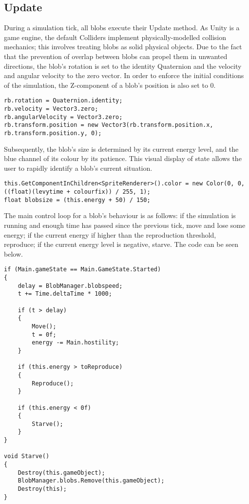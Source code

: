 \subsection{Update}
During a simulation tick, all blobs execute their Update method. As Unity is a game engine, the default Colliders implement physically-modelled collision mechanics; this involves treating blobs as solid physical objects. Due to the fact that the prevention of overlap between blobs can propel them in unwanted directions, the blob's rotation is set to the identity Quaternion and the velocity and angular velocity to the zero vector. In order to enforce the initial conditions of the simulation, the Z-component of a blob's position is also set to 0.

\begin{lstlisting}
rb.rotation = Quaternion.identity;
rb.velocity = Vector3.zero;
rb.angularVelocity = Vector3.zero;
rb.transform.position = new Vector3(rb.transform.position.x, rb.transform.position.y, 0);
\end{lstlisting}

Subsequently, the blob's size is determined by its current energy level, and the blue channel of its colour by its patience. This visual display of state allows the user to rapidly identify a blob's current situation.
	
\begin{lstlisting}
this.GetComponentInChildren<SpriteRenderer>().color = new Color(0, 0, ((float)(levytime + colourfix)) / 255, 1);
float blobsize = (this.energy + 50) / 150;
\end{lstlisting}

The main control loop for a blob's behaviour is as follows: if the simulation is running and enough time has passed since the previous tick, move and lose some energy; if the current energy if higher than the reproduction threshold, reproduce; if the current energy level is negative, starve. The code can be seen below.

\begin{lstlisting}
if (Main.gameState == Main.GameState.Started)
{
    delay = BlobManager.blobspeed;
    t += Time.deltaTime * 1000;
    
    if (t > delay)
    {
        Move();
        t = 0f;
        energy -= Main.hostility;
    }
    
    if (this.energy > toReproduce)
    {
        Reproduce();
    }
    
    if (this.energy < 0f)
    {
        Starve();
    }
}
		
void Starve()
{
    Destroy(this.gameObject);
    BlobManager.blobs.Remove(this.gameObject);
    Destroy(this);
}
\end{lstlisting}


